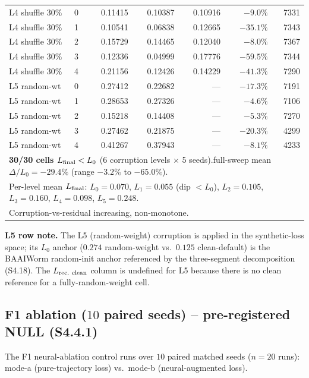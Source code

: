 \documentclass[11pt]{article}
\begin{document}
\begin{longtable}{l l r r r r r}
L4 shuffle $30\%$ & 0 & 0.11415 & 0.10387 & 0.10916 & $-9.0\%$ & 7331 \\
L4 shuffle $30\%$ & 1 & 0.10541 & 0.06838 & 0.12665 & $-35.1\%$ & 7343 \\
L4 shuffle $30\%$ & 2 & 0.15729 & 0.14465 & 0.12040 & $-8.0\%$ & 7367 \\
L4 shuffle $30\%$ & 3 & 0.12336 & 0.04999 & 0.17776 & $-59.5\%$ & 7344 \\
L4 shuffle $30\%$ & 4 & 0.21156 & 0.12426 & 0.14229 & $-41.3\%$ & 7290 \\
L5 random-wt & 0 & 0.27412 & 0.22682 & --- & $-17.3\%$ & 7191 \\
L5 random-wt & 1 & 0.28653 & 0.27326 & --- & $-4.6\%$ & 7106 \\
L5 random-wt & 2 & 0.15218 & 0.14408 & --- & $-5.3\%$ & 7270 \\
L5 random-wt & 3 & 0.27462 & 0.21875 & --- & $-20.3\%$ & 4299 \\
L5 random-wt & 4 & 0.41267 & 0.37943 & --- & $-8.1\%$ & 4233 \\\midrule
\multicolumn{7}{l}{\textbf{30/30 cells $L_{\rm final}<L_0$} (6 corruption levels $\times$ 5 seeds).\quad full-sweep mean $\Delta/L_0 = -29.4\%$ (range $-3.2\%$ to $-65.0\%$).} \\
\multicolumn{7}{l}{Per-level mean $L_{\rm final}$: $L_0{=}0.070$, $L_1{=}0.055$ (dip $<L_0$), $L_2{=}0.105$, $L_3{=}0.160$, $L_4{=}0.098$, $L_5{=}0.248$.} \\
\multicolumn{7}{l}{Corruption-vs-residual increasing, non-monotone.} \\\bottomrule
\end{longtable}

\textbf{L5 row note.} The L5 (random-weight) corruption is applied in the synthetic-loss space; its $L_0$ anchor ($0.274$ random-weight vs.\ $0.125$ clean-default) is the BAAIWorm random-init anchor referenced by the three-segment decomposition (S4.18). The $L_{\rm rec.\ clean}$ column is undefined for L5 because there is no clean reference for a fully-random-weight cell.

\subsection{F1 ablation ($10$ paired seeds) -- pre-registered NULL (S4.4.1)}

The F1 neural-ablation control runs over $10$ paired matched seeds ($n{=}20$ runs): mode-a (pure-trajectory loss) vs.\ mode-b (neural-augmented loss).
\end{document}
